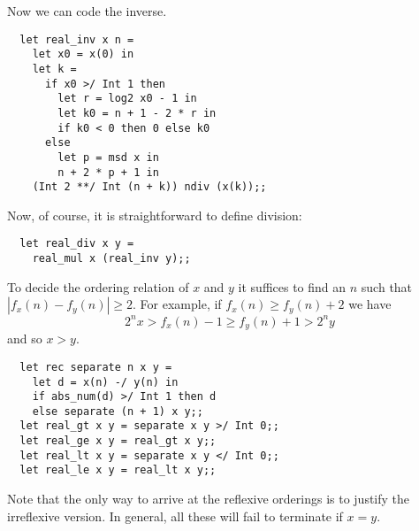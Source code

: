\begin{slide*}


\vspace*{0.5cm}

Now we can code the inverse.

\begin{black}\begin{verbatim}
  let real_inv x n =
    let x0 = x(0) in
    let k =
      if x0 >/ Int 1 then
        let r = log2 x0 - 1 in
        let k0 = n + 1 - 2 * r in
        if k0 < 0 then 0 else k0
      else
        let p = msd x in
        n + 2 * p + 1 in
    (Int 2 **/ Int (n + k)) ndiv (x(k));;
\end{verbatim}\end{black}

Now, of course, it is straightforward to define division:

\begin{black}\begin{verbatim}
  let real_div x y =
    real_mul x (real_inv y);;
\end{verbatim}\end{black}

\end{slide*}



\begin{slide*}


\vspace*{0.5cm}

To decide the ordering relation of {\red $x$} and {\red $y$} it suffices to
find an {\red $n$} such that {\red $|f_x(n) - f_y(n)| \geq 2$}. For example, if
{\red $f_x(n) \geq f_y(n) + 2$} we have
{\red $$ 2^n x > f_x(n) - 1 \geq f_y(n) + 1 > 2^n y $$}
\noindent and so {\red $x > y$}.

\begin{black}\begin{verbatim}
  let rec separate n x y =
    let d = x(n) -/ y(n) in
    if abs_num(d) >/ Int 1 then d
    else separate (n + 1) x y;;
  let real_gt x y = separate x y >/ Int 0;;
  let real_ge x y = real_gt x y;;
  let real_lt x y = separate x y </ Int 0;;
  let real_le x y = real_lt x y;;
\end{verbatim}\end{black}
Note that the only way to arrive at the reflexive orderings is to justify the
irreflexive version. In general, all these will fail to terminate if {\red $x = y$}.

\end{slide*}



